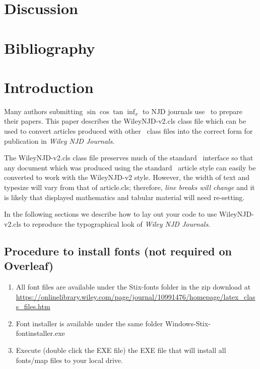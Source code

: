 \documentclass[AMA,STIX1COL]{WileyNJD-v2}
\begin{document}
\section{Discussion}

\section{Bibliography}
\nocite{*}%
%

\section{Introduction}\label{sec1}

Many authors submitting \( \sin \cos \tan \inf_{x} \) to NJD journals use \LaTeXe\ to
prepare their papers. This paper describes the
\textsf{WileyNJD-v2.cls} class file which can be used to convert
articles produced with other \LaTeXe\ class files into the correct
form for publication in \emph{Wiley NJD Journals}.

The \textsf{WileyNJD-v2.cls} class file preserves much of the standard
\LaTeXe\ interface so that any document which was produced using
the standard \LaTeXe\ \textsf{article} style can easily be
converted to work with the \textsf{WileyNJD-v2} style. However, the
width of text and typesize will vary from that of
\textsf{article.cls}; therefore, \emph{line breaks will change}
and it is likely that displayed mathematics and tabular material
will need re-setting.

In the following sections we describe how to lay out your code to
use \textsf{WileyNJD-v2.cls} to reproduce the typographical look of
\emph{Wiley NJD Journals}.

\subsection{Procedure to install fonts (not required on Overleaf)}
 
\begin{enumerate}
\item All font files are available under the Stix-fonts folder in the zip download at \url{https://onlinelibrary.wiley.com/page/journal/10991476/homepage/latex_class_files.htm}
\item Font installer is available under the same folder Windows-Stix-fontinstaller.exe
\item Execute (double click the EXE file) the EXE file that will install all fonts/map files to your local drive.
\end{enumerate}
\end{document}
